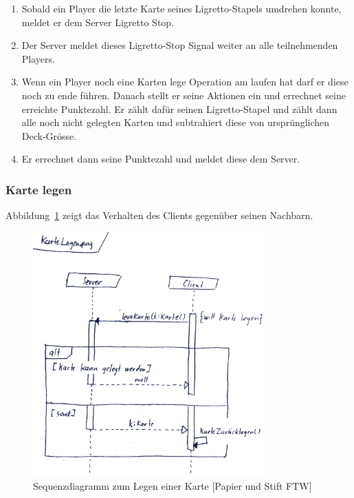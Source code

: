 \begin{enumerate}
	\item Sobald ein Player die letzte Karte seines Ligretto-Stapels umdrehen konnte, meldet er dem Server Ligretto Stop. 
	\item Der Server meldet dieses Ligretto-Stop Signal weiter an alle teilnehmenden Players.
	\item Wenn ein Player noch eine Karten lege Operation am laufen hat darf er diese noch zu ende führen. Danach stellt er seine Aktionen ein und errechnet seine erreichte Punktezahl. Er zählt dafür seinen Ligretto-Stapel und zählt dann alle noch nicht gelegten Karten und subtrahiert diese von ursprünglichen Deck-Grösse.
	\item Er errechnet dann seine Punktezahl und meldet diese dem Server.
\end{enumerate}

\subsubsection{Karte legen}

Abbildung~\ref{SequenzdiagramClient} zeigt das Verhalten des Clients gegenüber seinen Nachbarn.

\begin{figure}[H]
  \centering
  \includegraphics[width=0.80\textwidth,angle=0]{graphics/KarteLegen.png}
  \caption{Sequenzdiagramm zum Legen einer Karte [Papier und Stift FTW] \hfill{} }
  \label{SequenzdiagramClient}
\end{figure}

